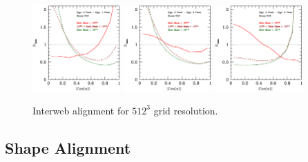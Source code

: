 \documentclass[usenatbib]{mn2e}
\begin{document}
\begin{figure}
\includegraphics[width=0.30\textwidth]{../plot2/512/512_T3V1.ps}
\includegraphics[width=0.30\textwidth]{../plot2/512/512_T3V2.ps}
\includegraphics[width=0.30\textwidth]{../plot2/512/512_T3V3.ps}
\caption{Interweb alignment for $512^3$ grid resolution.}
\end{figure}



\subsection{Shape Alignment}
\end{document}
